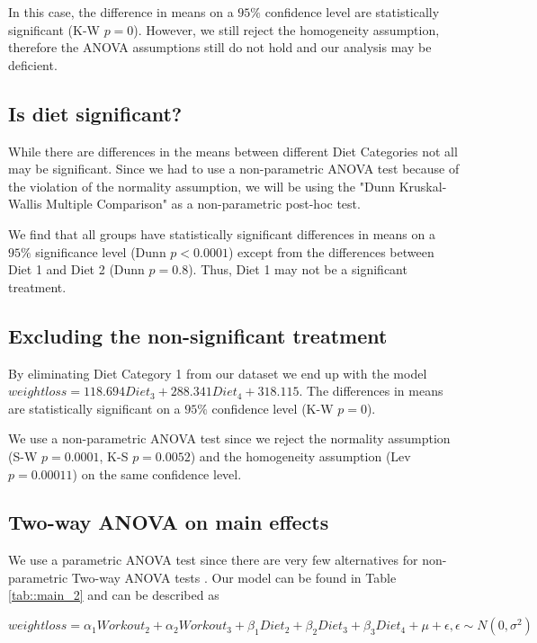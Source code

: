 \documentclass[12pt, a4paper]{article}
\begin{document}
	In this case, the difference in means on a $95\%$ confidence level are statistically significant (K-W $p=0$). However, we still reject the  homogeneity assumption, therefore the ANOVA assumptions still do not hold and our analysis may be deficient.
	
	
	\subsection{Is diet significant?}
	
	While there are differences in the means between different Diet Categories not all may be significant. Since we had to use a non-parametric ANOVA test because of the violation of the normality assumption, we will be using the "Dunn Kruskal-Wallis Multiple Comparison" as a non-parametric post-hoc test.
	
	We find that all groups have statistically significant differences in means on a $95\%$ significance level (Dunn $p<0.0001$) except from the differences between Diet 1 and Diet 2 (Dunn $p=0.8$). Thus, Diet 1 may not be a significant treatment.
	
	
	\subsection{Excluding the non-significant treatment}
	
	By eliminating Diet Category 1 from our dataset we end up with the model $weightloss = 118.694 Diet_3 + 288.341 Diet_4 + 318.115$. The differences in means are statistically significant on a $95\%$ confidence level (K-W $p=0$). 
	
	We use a non-parametric ANOVA test since we reject the normality assumption (S-W $p=0.0001$, K-S $p=0.0052$) and the homogeneity assumption (Lev $p=0.00011$) on the same confidence level. 
	
	
	\subsection{Two-way ANOVA on main effects}
	
	We use a parametric ANOVA test since there are very few alternatives for non-parametric Two-way ANOVA tests \cite{non_param_anova}. Our model can be found in Table \ref{tab::main_2} and can be described as
	
	$$
	weightloss = \alpha_1 Workout_2 + \alpha_2 Workout_3 + \beta_1 Diet_2 + \beta_2 Diet_3 + \beta_3 Diet_4 + \mu + \epsilon, \epsilon \sim N(0, \sigma^2)
	$$
	
\end{document}
